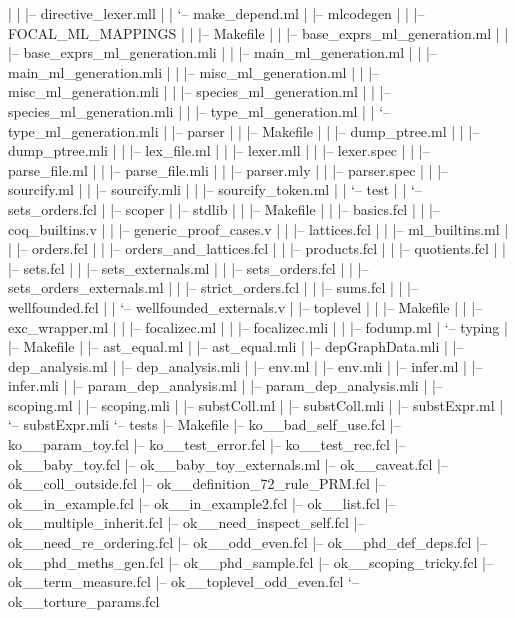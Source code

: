 \begin{itemize}
\begin{itemize}
|   |   |-- directive\_lexer.mll
|   |   `-- make\_depend.ml
|   |-- mlcodegen
|   |   |-- FOCAL\_ML\_MAPPINGS
|   |   |-- Makefile
|   |   |-- base\_exprs\_ml\_generation.ml
|   |   |-- base\_exprs\_ml\_generation.mli
|   |   |-- main\_ml\_generation.ml
|   |   |-- main\_ml\_generation.mli
|   |   |-- misc\_ml\_generation.ml
|   |   |-- misc\_ml\_generation.mli
|   |   |-- species\_ml\_generation.ml
|   |   |-- species\_ml\_generation.mli
|   |   |-- type\_ml\_generation.ml
|   |   `-- type\_ml\_generation.mli
|   |-- parser
|   |   |-- Makefile
|   |   |-- dump\_ptree.ml
|   |   |-- dump\_ptree.mli
|   |   |-- lex\_file.ml
|   |   |-- lexer.mll
|   |   |-- lexer.spec
|   |   |-- parse\_file.ml
|   |   |-- parse\_file.mli
|   |   |-- parser.mly
|   |   |-- parser.spec
|   |   |-- sourcify.ml
|   |   |-- sourcify.mli
|   |   |-- sourcify\_token.ml
|   |   `-- test
|   |       `-- sets\_orders.fcl
|   |-- scoper
|   |-- stdlib
|   |   |-- Makefile
|   |   |-- basics.fcl
|   |   |-- coq\_builtins.v
|   |   |-- generic\_proof\_cases.v
|   |   |-- lattices.fcl
|   |   |-- ml\_builtins.ml
|   |   |-- orders.fcl
|   |   |-- orders\_and\_lattices.fcl
|   |   |-- products.fcl
|   |   |-- quotients.fcl
|   |   |-- sets.fcl
|   |   |-- sets\_externals.ml
|   |   |-- sets\_orders.fcl
|   |   |-- sets\_orders\_externals.ml
|   |   |-- strict\_orders.fcl
|   |   |-- sums.fcl
|   |   |-- wellfounded.fcl
|   |   `-- wellfounded\_externals.v
|   |-- toplevel
|   |   |-- Makefile
|   |   |-- exc\_wrapper.ml
|   |   |-- focalizec.ml
|   |   |-- focalizec.mli
|   |   |-- fodump.ml
|   `-- typing
|       |-- Makefile
|       |-- ast\_equal.ml
|       |-- ast\_equal.mli
|       |-- depGraphData.mli
|       |-- dep\_analysis.ml
|       |-- dep\_analysis.mli
|       |-- env.ml
|       |-- env.mli
|       |-- infer.ml
|       |-- infer.mli
|       |-- param\_dep\_analysis.ml
|       |-- param\_dep\_analysis.mli
|       |-- scoping.ml
|       |-- scoping.mli
|       |-- substColl.ml
|       |-- substColl.mli
|       |-- substExpr.ml
|       `-- substExpr.mli
`-- tests
    |-- Makefile
    |-- ko\_\_bad\_self\_use.fcl
    |-- ko\_\_param\_toy.fcl
    |-- ko\_\_test\_error.fcl
    |-- ko\_\_test\_rec.fcl
    |-- ok\_\_baby\_toy.fcl
    |-- ok\_\_baby\_toy\_externals.ml
    |-- ok\_\_caveat.fcl
    |-- ok\_\_coll\_outside.fcl
    |-- ok\_\_definition\_72\_rule\_PRM.fcl
    |-- ok\_\_in\_example.fcl
    |-- ok\_\_in\_example2.fcl
    |-- ok\_\_list.fcl
    |-- ok\_\_multiple\_inherit.fcl
    |-- ok\_\_need\_inspect\_self.fcl
    |-- ok\_\_need\_re\_ordering.fcl
    |-- ok\_\_odd\_even.fcl
    |-- ok\_\_phd\_def\_deps.fcl
    |-- ok\_\_phd\_meths\_gen.fcl
    |-- ok\_\_phd\_sample.fcl
    |-- ok\_\_scoping\_tricky.fcl
    |-- ok\_\_term\_measure.fcl
    |-- ok\_\_toplevel\_odd\_even.fcl
    `-- ok\_\_torture\_params.fcl
  \end{itemize}
\end{itemize}

